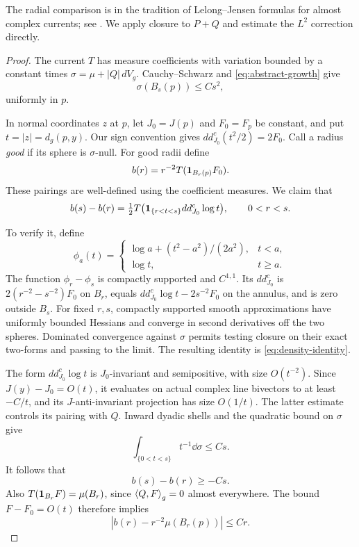 The radial comparison is in the tradition of Lelong--Jensen
formulas for almost complex currents; see
\cite[Proposition~1 and Corollary~2]{ElkhadhraMimouni2007}.
We apply closure to \(P+Q\) and estimate the \(L^2\) correction
directly.

\begin{proof}
The current \(T\) has measure coefficients with variation
bounded by a constant times
\(\sigma=\mu+|Q|\,dV_g\). Cauchy--Schwarz and
\eqref{eq:abstract-growth} give
\[
\sigma(B_s(p))\le Cs^2,
\]
uniformly in \(p\).

In normal coordinates \(z\) at \(p\), let \(J_0=J(p)\) and
\(F_0=F_p\) be constant, and put \(t=|z|=d_g(p,y)\).
Our sign convention gives
\(dd^c_{J_0}(t^2/2)=2F_0\). Call a radius \emph{good} if its sphere is
\(\sigma\)-null. For good radii define
\[
b(r)=r^{-2}T(\mathbf 1_{B_r(p)}F_0).
\]
These pairings are well-defined using the coefficient
measures. We claim that
\begin{equation}\label{eq:density-identity}
b(s)-b(r)=\tfrac12
T\bigl(\mathbf 1_{\{r<t<s\}}dd^c_{J_0}\log t\bigr),
\qquad 0<r<s.
\end{equation}

To verify it, define
\[
\phi_a(t)=
\begin{cases}
\log a+(t^2-a^2)/(2a^2),&t<a,\\
\log t,&t\ge a.
\end{cases}
\]
The function \(\phi_r-\phi_s\) is compactly supported and
\(C^{1,1}\). Its \(dd^c_{J_0}\) is
\(2(r^{-2}-s^{-2})F_0\) on \(B_r\), equals
\(dd^c_{J_0}\log t-2s^{-2}F_0\) on the annulus, and is
zero outside \(B_s\). For fixed \(r,s\), compactly supported
smooth approximations have uniformly bounded Hessians and
converge in second derivatives off the two spheres.
Dominated convergence against \(\sigma\) permits testing
closure on their exact two-forms and passing to the limit.
The resulting identity is \eqref{eq:density-identity}.

The form \(dd^c_{J_0}\log t\) is \(J_0\)-invariant and
semipositive, with size \(O(t^{-2})\).
Since \(J(y)-J_0=O(t)\), it evaluates on actual complex
line bivectors to at least \(-C/t\), and its
\(J\)-anti-invariant projection has size \(O(1/t)\).
The latter estimate controls its pairing with \(Q\).
Inward dyadic shells and the quadratic bound on \(\sigma\)
give
\[
\int_{\{0<t<s\}}t^{-1}\dd\sigma\le Cs.
\]
It follows that
\begin{equation}\label{eq:almost-monotone}
b(s)-b(r)\ge-Cs.
\end{equation}
Also \(T(\mathbf 1_{B_r}F)=\mu(B_r)\), since
\(\left\langle Q,F\right\rangle_g=0\) almost everywhere. The bound
\(F-F_0=O(t)\) therefore implies
\begin{equation}\label{eq:density-error}
|b(r)-r^{-2}\mu(B_r(p))|\le Cr.
\end{equation}


\end{proof}

